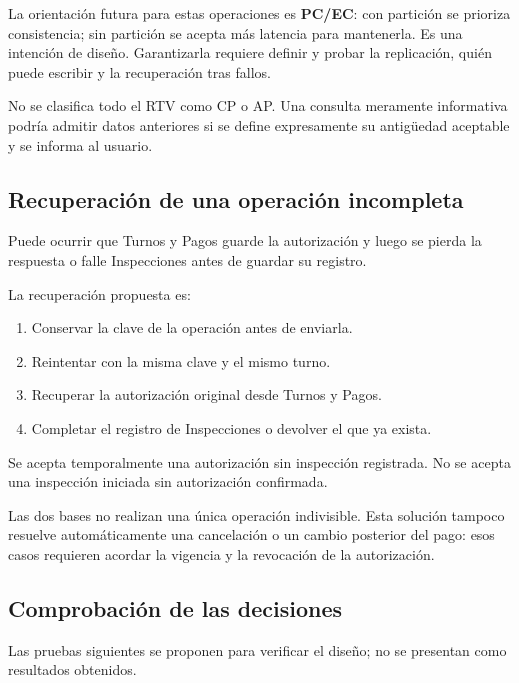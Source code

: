 \documentclass[11pt,a4paper]{article}
\begin{document}
La orientación futura para estas operaciones es \textbf{PC/EC}: con partición se prioriza consistencia; sin partición se acepta más latencia para mantenerla. Es una intención de diseño. Garantizarla requiere definir y probar la replicación, quién puede escribir y la recuperación tras fallos.

No se clasifica todo el RTV como CP o AP. Una consulta meramente informativa podría admitir datos anteriores si se define expresamente su antigüedad aceptable y se informa al usuario.

\subsection{Recuperación de una operación incompleta}

Puede ocurrir que Turnos y Pagos guarde la autorización y luego se pierda la respuesta o falle Inspecciones antes de guardar su registro.

La recuperación propuesta es:

\begin{enumerate}[nosep]
  \item Conservar la clave de la operación antes de enviarla.
  \item Reintentar con la misma clave y el mismo turno.
  \item Recuperar la autorización original desde Turnos y Pagos.
  \item Completar el registro de Inspecciones o devolver el que ya exista.
\end{enumerate}

Se acepta temporalmente una autorización sin inspección registrada. No se acepta una inspección iniciada sin autorización confirmada.

Las dos bases no realizan una única operación indivisible. Esta solución tampoco resuelve automáticamente una cancelación o un cambio posterior del pago: esos casos requieren acordar la vigencia y la revocación de la autorización.

\subsection{Comprobación de las decisiones}

Las pruebas siguientes se proponen para verificar el diseño; no se presentan como resultados obtenidos.
\end{document}
